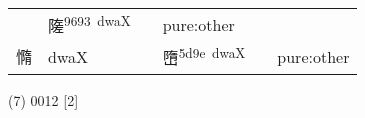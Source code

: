 \documentclass[14pt,a4paper]{scrartcl}
\begin{document}
\begin{longtable}[c]{@{}llllll@{}}
\begin{minipage}[t]{0.14\columnwidth}\raggedright\strut
\strut\end{minipage} &
\begin{minipage}[t]{0.14\columnwidth}\raggedright\strut
隓\textsuperscript{9693~dwaX}
\strut\end{minipage} &
\begin{minipage}[t]{0.14\columnwidth}\raggedright\strut
\strut\end{minipage} &
\begin{minipage}[t]{0.14\columnwidth}\raggedright\strut
pure:other
\strut\end{minipage}\tabularnewline
\begin{minipage}[t]{0.14\columnwidth}\raggedright\strut
憜
\strut\end{minipage} &
\begin{minipage}[t]{0.14\columnwidth}\raggedright\strut
dwaX
\strut\end{minipage} &
\begin{minipage}[t]{0.14\columnwidth}\raggedright\strut
\strut\end{minipage} &
\begin{minipage}[t]{0.14\columnwidth}\raggedright\strut
嶞\textsuperscript{5d9e~dwaX}
\strut\end{minipage} &
\begin{minipage}[t]{0.14\columnwidth}\raggedright\strut
\strut\end{minipage} &
\begin{minipage}[t]{0.14\columnwidth}\raggedright\strut
pure:other
\strut\end{minipage}\tabularnewline
\bottomrule
\end{longtable}

(7) 0012 {[}2{]}
\end{document}
